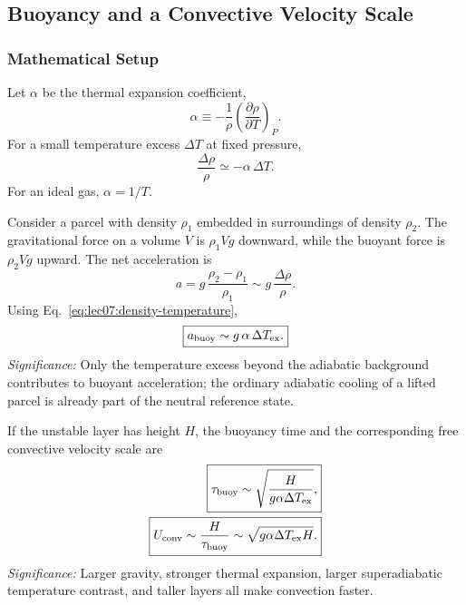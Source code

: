 \subsection{Buoyancy and a Convective Velocity Scale}
\label{sec:lec07:buoyancy-velocity}

\subsubsection*{Mathematical Setup}
Let $\alpha$ be the thermal expansion coefficient,
\begin{equation}
    \alpha \equiv -\frac{1}{\rho}
    \left(\frac{\partial \rho}{\partial T}\right)_P .
    \label{eq:lec07:thermal-expansion}
\end{equation}
For a small temperature excess $\Delta T$ at fixed pressure,
\begin{equation}
    \frac{\Delta\rho}{\rho}\simeq -\alpha\,\Delta T .
    \label{eq:lec07:density-temperature}
\end{equation}
For an ideal gas, $\alpha=1/T$.

Consider a parcel with density $\rho_1$ embedded in surroundings of density
$\rho_2$. The gravitational force on a volume $V$ is $\rho_1 Vg$ downward,
while the buoyant force is $\rho_2 Vg$ upward. The net acceleration is
\begin{equation}
    a
    = g\,\frac{\rho_2-\rho_1}{\rho_1}
    \sim g\,\frac{\Delta\rho}{\rho}.
    \label{eq:lec07:buoyant-acceleration-density}
\end{equation}
Using Eq.~\eqref{eq:lec07:density-temperature},
\begin{equation}
    \boxed{
    a_{\rm buoy} \sim g\,\alpha\,\Delta T_{\rm ex}.
    }
    \label{eq:lec07:buoyant-acceleration}
\end{equation}
\textit{Significance:} Only the temperature excess beyond the adiabatic
background contributes to buoyant acceleration; the ordinary adiabatic cooling
of a lifted parcel is already part of the neutral reference state.

If the unstable layer has height $H$, the buoyancy time and the corresponding
free convective velocity scale are
\begin{align}
    \boxed{
    \tau_{\rm buoy}
    \sim \sqrt{\frac{H}{g\alpha\Delta T_{\rm ex}}},
    }
    \label{eq:lec07:buoyancy-time}\\
    \boxed{
    U_{\rm conv}
    \sim \frac{H}{\tau_{\rm buoy}}
    \sim \sqrt{g\alpha\Delta T_{\rm ex}H}.
    }
    \label{eq:lec07:convective-velocity}
\end{align}
\textit{Significance:} Larger gravity, stronger thermal expansion, larger
superadiabatic temperature contrast, and taller layers all make convection
faster.


